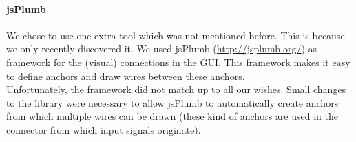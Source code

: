 \documentclass[a4paper]{article}
\begin{document}
\label{jsPlumb}\paragraph{jsPlumb}
We chose to use one extra tool which was not mentioned before. This is because we only recently discovered it. We used jsPlumb (\url{http://jsplumb.org/}) as framework for the (visual) connections in the GUI. This framework makes it easy to define anchors and draw wires between these anchors. \\
Unfortunately, the framework did not match up to all our wishes. Small changes to the library were necessary to allow jsPlumb to automatically create anchors from which multiple wires can be drawn (these kind of anchors are used in the connector from which input signals originate).
\end{document}
